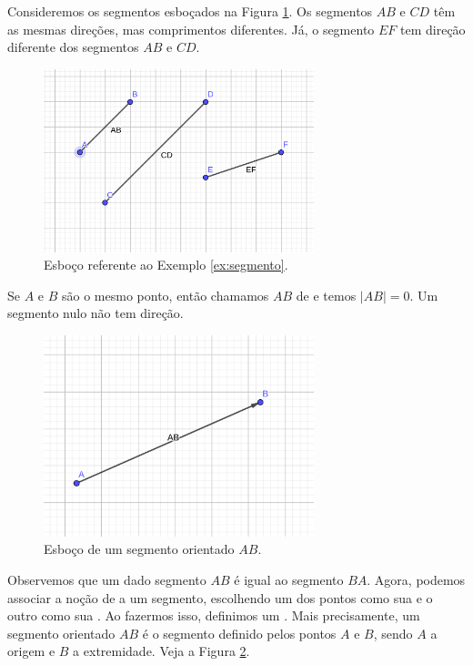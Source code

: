 \begin{ex}\label{ex:segmento}
  Consideremos os segmentos esboçados na Figura \ref{fig:ex_segmento}. Os segmentos $AB$ e $CD$ têm as mesmas direções, mas comprimentos diferentes. Já, o segmento $EF$ tem direção diferente dos segmentos $AB$ e $CD$.
  
  \begin{figure}[h!]
    \centering
    \includegraphics[width=0.7\textwidth]{./cap_vetor/dados/fig_ex_segmento/fig_ex_segmento}
  \caption{Esboço referente ao Exemplo \ref{ex:segmento}.}
  \label{fig:ex_segmento}
\end{figure}
\end{ex}

Se $A$ e $B$ são o mesmo ponto, então chamamos $AB$ de  e temos $|AB| = 0$. Um segmento nulo não tem direção.

\begin{figure}[h!]
  \centering
  \includegraphics[width=0.7\textwidth]{./cap_vetor/dados/fig_seg_orientado/fig_seg_orientado}
  \caption{Esboço de um segmento orientado $AB$.}
  \label{fig:seg_orientado}
\end{figure}


Observemos que um dado segmento $AB$ é igual ao segmento $BA$. Agora, podemos associar a noção de  a um segmento, escolhendo um dos pontos como sua  e o outro como sua . Ao fazermos isso, definimos um . Mais precisamente, um segmento orientado $AB$ é o segmento definido pelos pontos $A$ e $B$, sendo $A$ a origem e $B$ a extremidade. Veja a Figura \ref{fig:seg_orientado}.


